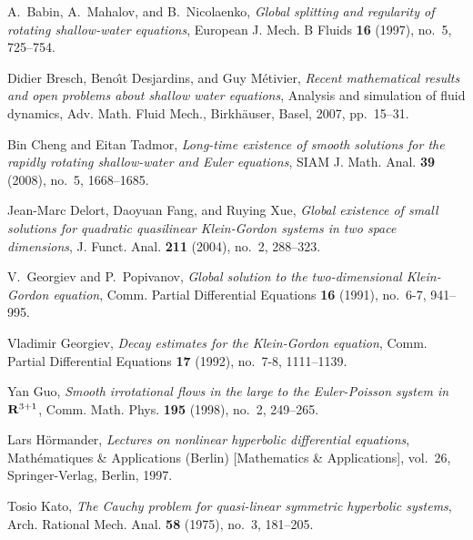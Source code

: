 \documentclass[12pt]{amsart}
\numberwithin{equation}{section} \numberwithin{theorem}{section}
\numberwithin{example}{section} \numberwithin{remark}{section}
\numberwithin{figure}{section} \numberwithin{algorithm}{section}
\begin{document}
\providecommand{\bysame}{\leavevmode\hbox to3em{\hrulefill}\thinspace}
\providecommand{\MR}{\relax\ifhmode\unskip\space\fi MR }
\providecommand{\MRhref}[2]{%
  \href{http://www.ams.org/mathscinet-getitem?mr=#1}{#2}
}
\providecommand{\href}[2]{#2}
\begin{thebibliography}{10}

A.~Babin, A.~Mahalov, and B.~Nicolaenko, \emph{Global splitting and regularity
  of rotating shallow-water equations}, European J. Mech. B Fluids \textbf{16}
  (1997), no.~5, 725--754.

Didier Bresch, Beno{\^{\i}}t Desjardins, and Guy M{\'e}tivier, \emph{Recent
  mathematical results and open problems about shallow water equations},
  Analysis and simulation of fluid dynamics, Adv. Math. Fluid Mech.,
  Birkh\"auser, Basel, 2007, pp.~15--31.

Bin Cheng and Eitan Tadmor, \emph{Long-time existence of smooth solutions for
  the rapidly rotating shallow-water and {E}uler equations}, SIAM J. Math.
  Anal. \textbf{39} (2008), no.~5, 1668--1685.

Jean-Marc Delort, Daoyuan Fang, and Ruying Xue, \emph{Global existence of small
  solutions for quadratic quasilinear {K}lein-{G}ordon systems in two space
  dimensions}, J. Funct. Anal. \textbf{211} (2004), no.~2, 288--323.

V.~Georgiev and P.~Popivanov, \emph{Global solution to the two-dimensional
  {K}lein-{G}ordon equation}, Comm. Partial Differential Equations \textbf{16}
  (1991), no.~6-7, 941--995.

Vladimir Georgiev, \emph{Decay estimates for the {K}lein-{G}ordon equation},
  Comm. Partial Differential Equations \textbf{17} (1992), no.~7-8, 1111--1139.

Yan Guo, \emph{Smooth irrotational flows in the large to the {E}uler-{P}oisson
  system in {$\bold R\sp {3+1}$}}, Comm. Math. Phys. \textbf{195} (1998),
  no.~2, 249--265.

Lars H{\"o}rmander, \emph{Lectures on nonlinear hyperbolic differential
  equations}, Math\'ematiques \& Applications (Berlin) [Mathematics \&
  Applications], vol.~26, Springer-Verlag, Berlin, 1997.

Tosio Kato, \emph{The {C}auchy problem for quasi-linear symmetric hyperbolic
  systems}, Arch. Rational Mech. Anal. \textbf{58} (1975), no.~3, 181--205.


\end{thebibliography}
\end{document}
